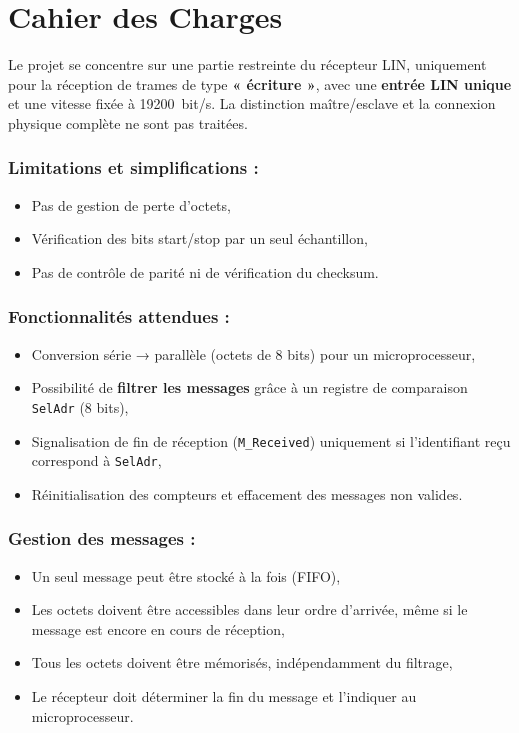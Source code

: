 \section{Cahier des Charges}

Le projet se concentre sur une partie restreinte du récepteur LIN, uniquement pour la réception de trames de type \textbf{« écriture »}, avec une \textbf{entrée LIN unique} et une vitesse fixée à \SI{19200}{bit/s}. La distinction maître/esclave et la connexion physique complète ne sont pas traitées.

\subsubsection*{Limitations et simplifications :}
\begin{itemize}
    \item Pas de gestion de perte d’octets,
    \item Vérification des bits start/stop par un seul échantillon,
    \item Pas de contrôle de parité ni de vérification du checksum.
\end{itemize}

\subsubsection*{Fonctionnalités attendues :}
\begin{itemize}
    \item Conversion série → parallèle (octets de 8 bits) pour un microprocesseur,
    \item Possibilité de \textbf{filtrer les messages} grâce à un registre de comparaison \texttt{SelAdr} (8 bits),
    \item Signalisation de fin de réception (\texttt{M\_Received}) uniquement si l’identifiant reçu correspond à \texttt{SelAdr},
    \item Réinitialisation des compteurs et effacement des messages non valides.
\end{itemize}

\subsubsection*{Gestion des messages :}
\begin{itemize}
    \item Un seul message peut être stocké à la fois (FIFO),
    \item Les octets doivent être accessibles dans leur ordre d’arrivée, même si le message est encore en cours de réception,
    \item Tous les octets doivent être mémorisés, indépendamment du filtrage,
    \item Le récepteur doit déterminer la fin du message et l’indiquer au microprocesseur.
\end{itemize}

